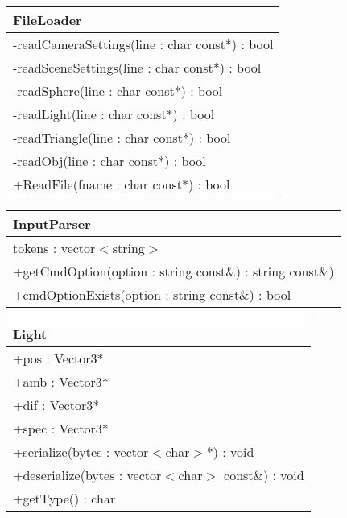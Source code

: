 \begin{center}
    \begin{tabular}{|l|}
    \hline
    FileLoader \\ \hline
    -readCameraSettings(line : char const*) : bool \\
    -readSceneSettings(line : char const*) : bool \\
    -readSphere(line : char const*) : bool \\
    -readLight(line : char const*) : bool \\
    -readTriangle(line : char const*) : bool \\
    -readObj(line : char const*) : bool \\
	+ReadFile(fname : char const*) : bool \\ \hline
    \end{tabular}
\end{center}


\begin{center}
    \begin{tabular}{|l|}
    \hline
    InputParser \\ \hline
    tokens : vector$<$string$>$  \\ \hline
    +getCmdOption(option : string const\&) : string const\&) \\
    +cmdOptionExists(option : string const\&) : bool \\ \hline
    \end{tabular}
\end{center}


\begin{center}
    \begin{tabular}{|l|}
    \hline
    Light \\ \hline
    +pos : Vector3* \\ 
    +amb : Vector3* \\
    +dif : Vector3* \\
    +spec : Vector3* \\
    \hline
	+serialize(bytes : vector$<$char$>$*) : void \\ 
	+deserialize(bytes : vector$<$char$>$ const\&) : void \\
	+getType() : char \\
	\hline
    \end{tabular}
\end{center}


